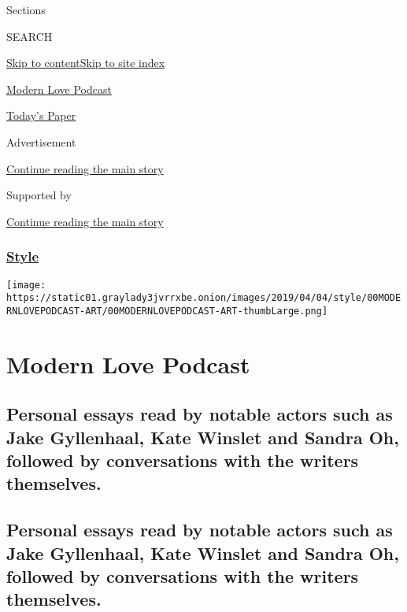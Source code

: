 Sections

SEARCH

\protect\hyperlink{site-content}{Skip to
content}\protect\hyperlink{site-index}{Skip to site index}

\href{https://www.nytimes3xbfgragh.onion/column/modern-love-podcast}{Modern
Love Podcast}

\href{https://myaccount.nytimes3xbfgragh.onion/auth/login?response_type=cookie\&client_id=vi}{}

\href{https://www.nytimes3xbfgragh.onion/section/todayspaper}{Today's
Paper}

Advertisement

\protect\hyperlink{after-top}{Continue reading the main story}

Supported by

\protect\hyperlink{after-sponsor}{Continue reading the main story}

\hypertarget{style}{%
\subsubsection{\texorpdfstring{\href{/section/style}{Style}}{Style}}\label{style}}

\texttt{[image: https://static01.graylady3jvrrxbe.onion/images/2019/04/04/style/00MODERNLOVEPODCAST-ART/00MODERNLOVEPODCAST-ART-thumbLarge.png]}

\hypertarget{modern-love-podcast}{%
\section{Modern Love Podcast}\label{modern-love-podcast}}

\hypertarget{personal-essays-read-by-notable-actors-such-as-jake-gyllenhaal-kate-winslet-and-sandra-oh-followed-by-conversations-with-the-writers-themselves}{%
\subsection{Personal essays read by notable actors such as Jake
Gyllenhaal, Kate Winslet and Sandra Oh, followed by conversations with
the writers
themselves.}\label{personal-essays-read-by-notable-actors-such-as-jake-gyllenhaal-kate-winslet-and-sandra-oh-followed-by-conversations-with-the-writers-themselves}}

\hypertarget{personal-essays-read-by-notable-actors-such-as-jake-gyllenhaal-kate-winslet-and-sandra-oh-followed-by-conversations-with-the-writers-themselves-1}{%
\subsection{Personal essays read by notable actors such as Jake
Gyllenhaal, Kate Winslet and Sandra Oh, followed by conversations with
the writers
themselves.}\label{personal-essays-read-by-notable-actors-such-as-jake-gyllenhaal-kate-winslet-and-sandra-oh-followed-by-conversations-with-the-writers-themselves-1}}

